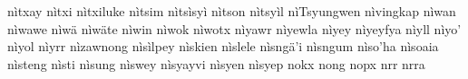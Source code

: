 \documentclass[a4paper]{article}
\begin{document}
nìtxay\hspace{2mm}
nìtxi\hspace{2mm}
nìtxiluke\hspace{2mm}
nìtsim\hspace{2mm}
nìtsìsyì\hspace{2mm}
nìtson\hspace{2mm}
nìtsyìl\hspace{2mm}
nìTsyungwen\hspace{2mm}
nìvingkap\hspace{2mm}
nìwan\hspace{2mm}
nìwawe\hspace{2mm}
nìwä\hspace{2mm}
nìwäte\hspace{2mm}
nìwin\hspace{2mm}
nìwok\hspace{2mm}
nìwotx\hspace{2mm}
nìyawr\hspace{2mm}
nìyewla\hspace{2mm}
nìyey\hspace{2mm}
nìyeyfya\hspace{2mm}
nìyll\hspace{2mm}
nìyo'\hspace{2mm}
nìyol\hspace{2mm}
nìyrr\hspace{2mm}
nìzawnong\hspace{2mm}
nìsìlpey\hspace{2mm}
nìskien\hspace{2mm}
nìslele\hspace{2mm}
nìsngä'i\hspace{2mm}
nìsngum\hspace{2mm}
nìso'ha\hspace{2mm}
nìsoaia\hspace{2mm}
nìsteng\hspace{2mm}
nìsti\hspace{2mm}
nìsung\hspace{2mm}
nìswey\hspace{2mm}
nìsyayvi\hspace{2mm}
nìsyen\hspace{2mm}
nìsyep\hspace{2mm}
nokx\hspace{2mm}
nong\hspace{2mm}
nopx\hspace{2mm}
nrr\hspace{2mm}
nrra\hspace{2mm}
\end{document}
